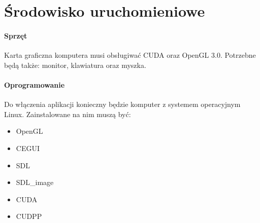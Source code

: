 \section{Środowisko uruchomieniowe}

\paragraph{Sprzęt}
Karta graficzna komputera musi obsługiwać CUDA oraz OpenGL 3.0. Potrzebne będą także: monitor, klawiatura oraz myszka.

\paragraph{Oprogramowanie}
Do włączenia aplikacji konieczny będzie komputer z systemem operacyjnym Linux. Zainstalowane na nim muszą być: 
\begin{itemize}
\item{OpenGL}
\item{CEGUI}
\item{SDL}
\item{SDL\_image}
\item{CUDA}
\item{CUDPP}
\end{itemize}


